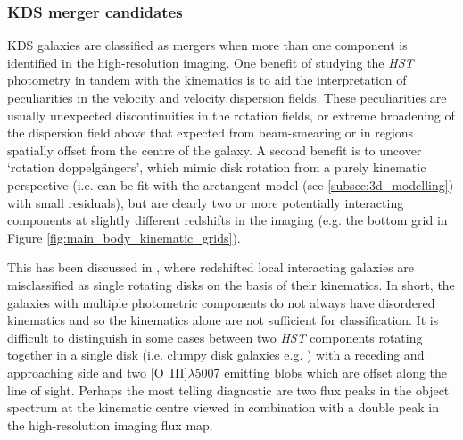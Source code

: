 \documentclass[fleqn,usenatbib]{mn2e}
\begin{document}
\subsubsection{KDS merger candidates}\label{subsubsection:merger_candidates}
KDS galaxies are classified as mergers when more than one component is identified in the high-resolution imaging.  
One benefit of studying the {\em HST} photometry in tandem with the kinematics is to aid the interpretation of peculiarities in the velocity and velocity dispersion fields.
These peculiarities are usually unexpected discontinuities in the rotation fields, or extreme broadening of the dispersion field above that expected from beam-smearing or in regions spatially offset from the centre of the galaxy.
A second benefit is to uncover `rotation doppelg{\"a}ngers', which mimic disk rotation from a purely kinematic perspective (i.e. can be fit with the arctangent model (see \cref{subsec:3d_modelling}) with small residuals), but are clearly two or more potentially interacting components at slightly different redshifts in the imaging (e.g. the bottom grid in Figure \ref{fig:main_body_kinematic_grids}).

This has been discussed in \cite{Hung2015}, where redshifted local interacting galaxies are misclassified as single rotating disks on the basis of their kinematics. 
In short, the galaxies with multiple photometric components do not always have disordered kinematics and so the kinematics alone are not sufficient for classification.
It is difficult to distinguish in some cases between two {\em HST} components rotating together in a single disk (i.e. clumpy disk galaxies e.g. \citealt{Elmegreen2004,Bournaud2007}) with a receding and approaching side and two [O~{\sc III}]$\lambda$5007 emitting blobs which are offset along the line of sight.
Perhaps the most telling diagnostic are two flux peaks in the object spectrum at the kinematic centre viewed in combination with a double peak in the high-resolution imaging flux map. \\
\end{document}
